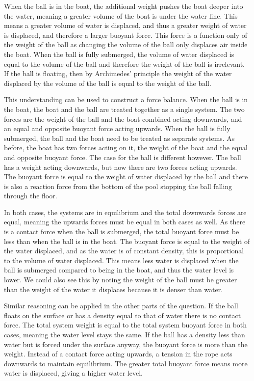 When the ball is in the boat, the additional weight pushes the boat deeper into the water, meaning a greater volume of the boat is under the water line. This means a greater volume of water is displaced, and thus a greater weight of water is displaced, and therefore a larger buoyant force. This force is a function only of the weight of the ball as changing the volume of the ball only displaces air inside the boat. When the ball is fully submerged, the volume of water displaced is equal to the volume of the ball and therefore the weight of the ball is irrelevant. If the ball is floating, then by Archimedes' principle the weight of the water displaced by the volume of the ball is equal to the weight of the ball.

This understanding can be used to construct a force balance. When the ball is in the boat, the boat and the ball are treated together as a single system. The two forces are the weight of the ball and the boat combined acting downwards, and an equal and opposite buoyant force acting upwards. When the ball is fully submerged, the ball and the boat need to be treated as separate systems. As before, the boat has two forces acting on it, the weight of the boat and the equal and opposite buoyant force. The case for the ball is different however. The ball has a weight acting downwards, but now there are two forces acting upwards. The buoyant force is equal to the weight of water displaced by the ball and there is also a reaction force from the bottom of the pool stopping the ball falling through the floor.

In both cases, the systems are in equilibrium and the total downwards forces are equal, meaning the upwards forces must be equal in both cases as well. As there is a contact force when the ball is submerged, the total buoyant force must be less than when the ball is in the boat. The buoyant force is equal to the weight of the water displaced, and as the water is of constant density, this is proportional to the volume of water displaced. This means less water is displaced when the ball is submerged compared to being in the boat, and thus the water level is lower. We could also see this by noting the weight of the ball must be greater than the weight of the water it displaces because it is denser than water.

Similar reasoning can be applied in the other parts of the question. If the ball floats on the surface or has a density equal to that of water there is no contact force. The total system weight is equal to the total system buoyant force in both cases, meaning the water level stays the same. If the ball has a density less than water but is forced under the surface anyway, the buoyant force is more than the weight. Instead of a contact force acting upwards, a tension in the rope acts downwards to maintain equilibrium. The greater total buoyant force means more water is displaced, giving a higher water level.

